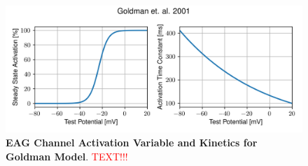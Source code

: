 \documentclass[../main.tex]{subfiles}
\begin{document}
\begin{figure}[!t]
    \centering
    \includegraphics[width=0.8\linewidth]{../img/spiking_to_bursting/eag_goldman.png}
    \caption[EAG Channel Activation Variable and Kinetics for Goldman Model]{
        \textbf{EAG Channel Activation Variable and Kinetics for Goldman Model}. \textcolor{red}{TEXT!!!}
    }
    \label{fig:spiking_to_bursting_eag_params_goldman}
\end{figure}
\end{document}
